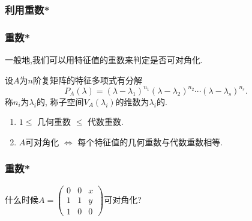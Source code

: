 \subsubsection{利用重数*}
\begin{frame}\frametitle{重数*}
一般地,我们可以用特征值的重数来判定是否可对角化.
\pp
\begin{definition}
设$A$为$n$阶复矩阵的特征多项式有分解
\[P_A(\lambda) = (\lambda-\lambda_1)^{n_1}(\lambda-\lambda_2)^{n_2}\cdots(\lambda-\lambda_s)^{n_s}.\]
\pp
称$n_i$为$\lambda_i$的,
\pp
称子空间$V_A(\lambda_i)$的维数为$\lambda_i$的.
\end{definition}
\pp
\begin{theorem}[利用特征值的重数来判定]
\begin{enumerate}
\item $1\leq$ 几何重数 $\leq$ 代数重数.
\pp
\item $A$可对角化 $\Leftrightarrow$ 每个特征值的几何重数与代数重数相等.
\end{enumerate}
\end{theorem}
\pp
{}
\end{frame}






\begin{frame}\frametitle{重数*}

\begin{example}
什么时候$A=\begin{pmatrix}0&0&x\\1&1&y\\1&0&0\end{pmatrix}$可对角化?
\end{example}
\pp
{}
\end{frame}



\renewcommand{\mydate}{2025年05月22号\ 第二十三次课}


